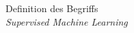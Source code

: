 \documentclass[preview]{standalone}
\begin{document}
\begin{center}
Definition des Begriffs \\ \textit{Supervised Machine Learning}
\end{center}
\end{document}
